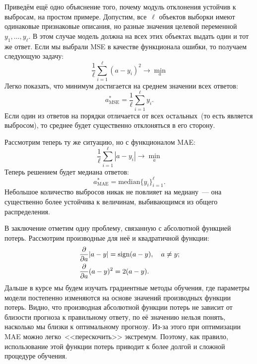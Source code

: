 \documentclass[12pt,fleqn]{article}
\begin{document}
Приведём ещё одно объяснение того, почему модуль отклонения устойчив к выбросам,
на простом примере.
Допустим, все~$\ell$ объектов выборки имеют одинаковые признаковые описания, но разные
значения целевой переменной~$y_1, \dots, y_\ell$.
В этом случае модель должна на всех этих объектах выдать один и тот же ответ.
Если мы выбрали MSE в качестве функционала ошибки, то получаем следующую задачу:
\[
    \frac{1}{\ell}
    \sum_{i = 1}^{\ell} \left(
        a - y_i
    \right)^2
    \to
    \min_a
\]
Легко показать, что минимум достигается на среднем значении всех ответов:
\[
    a_{\text{MSE}}^*
    =
    \frac{1}{\ell}
    \sum_{i = 1}^{\ell}
        y_i.
\]
Если один из ответов на порядки отличается от всех остальных~(то есть является выбросом),
то среднее будет существенно отклоняться в его сторону.

Рассмотрим теперь ту же ситуацию, но с функционалом MAE:
\[
    \frac{1}{\ell}
    \sum_{i = 1}^{\ell} \left|
        a - y_i
    \right|
    \to
    \min_a
\]
Теперь решением будет медиана ответов:
\[
    a_{\text{MAE}}^*
    =
    \text{median}
        \{y_i\}_{i = 1}^{\ell}.
\]
Небольшое количество выбросов никак не повлияет на медиану~--- она существенно
более устойчива к величинам, выбивающимся из общего распределения.

В заключение отметим одну проблему, связанную с абсолютной функцией потерь.
Рассмотрим производные для неё и квадратичной функции:
\begin{align*}
    &\frac{\partial}{\partial a} |a - y| = \mathop{\rm sign}\limits (a - y), \quad a \neq y; \\
    &\frac{\partial}{\partial a} (a - y)^2 = 2 (a - y).
\end{align*}
Дальше в курсе мы будем изучать градиентные методы обучения,
где параметры модели постепенно изменяются на основе значений производных функции потерь.
Видно, что производная абсолютной функции потерь не зависит от близости прогноза к правильному ответу,
по её значению нельзя понять, насколько мы близки к оптимальному прогнозу.
Из-за этого при оптимизации MAE можно легко~<<перескочить>> экстремум.
Поэтому, как правило, использование этой функции потерь приводит к более долгой и сложной
процедуре обучения.
\end{document}
